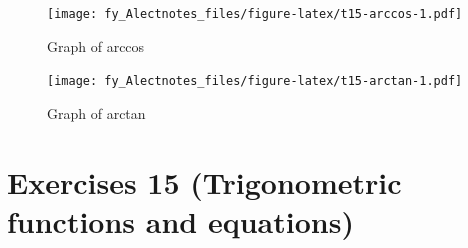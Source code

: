 \documentclass[
  12pt,
  oneside]{book}
\theoremstyle{definition}
\theoremstyle{definition}
\theoremstyle{definition}
\theoremstyle{definition}
\theoremstyle{remark}
\begin{document}
\begin{figure}
\centering
\texttt{[image: fy\_Alectnotes\_files/figure-latex/t15-arccos-1.pdf]}
\caption{\label{fig:t15-arccos}Graph of arccos}
\end{figure}

\begin{figure}
\centering
\texttt{[image: fy\_Alectnotes\_files/figure-latex/t15-arctan-1.pdf]}
\caption{\label{fig:t15-arctan}Graph of arctan}
\end{figure}

\hypertarget{exercises-15-trigonometric-functions-and-equations}{%
\chapter*{Exercises 15 (Trigonometric functions and equations)}\label{exercises-15-trigonometric-functions-and-equations}}
\end{document}
